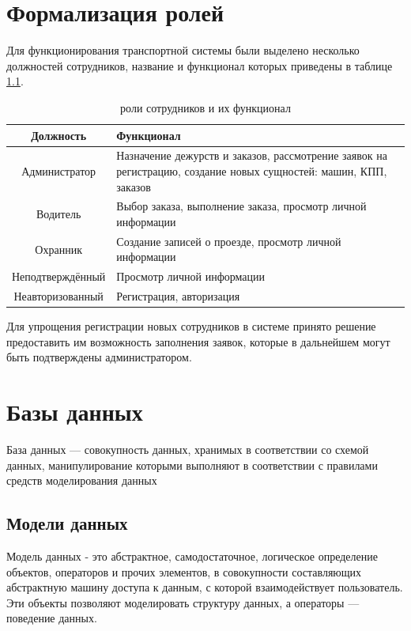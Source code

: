 \section{Формализация ролей}
Для функционирования транспортной системы были выделено несколько должностей сотрудников, название и функционал которых приведены в таблице \hyperref[role_table]{1.1}.

\begin{table}[h] \label{role_table}
	\caption{роли сотрудников и их функционал}
	\begin{tabular}{| c | p{11cm} |}
		\hline
		\textbf{Должность}		&	\textbf{Функционал} \\
		\hline
		Администратор			&	
		Назначение дежурств и заказов, рассмотрение заявок на регистрацию, создание новых сущностей: машин, КПП, заказов  \\
		\hline
		
		Водитель &
		Выбор заказа, выполнение заказа, просмотр личной информации \\
		\hline
		
		Охранник &
		Создание записей о проезде, просмотр личной информации  \\
		\hline
		
		Неподтверждённый &
		Просмотр личной информации  \\	
		\hline	
		
		Неавторизованный &
		Регистрация, авторизация  \\		
		\hline
	\end{tabular}
\end{table}

Для упрощения регистрации новых сотрудников в системе принято решение предоставить им возможность заполнения заявок, которые в дальнейшем могут быть подтверждены администратором.

\section{Базы данных}
База данных — совокупность данных, хранимых в соответствии со схемой данных, манипулирование которыми выполняют в соответствии с правилами средств моделирования данных \cite{db_model}

\subsection{Модели данных}
Модель данных - это абстрактное, самодостаточное, логическое определение объектов, операторов и прочих элементов, в совокупности составляющих абстрактную машину доступа к данным, с которой взаимодействует пользователь. Эти объекты позволяют моделировать
структуру данных, а операторы — поведение данных.
\cite{db_model}

